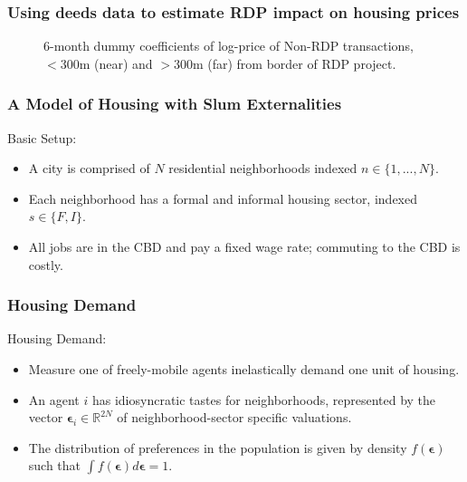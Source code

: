 \documentclass[aspectratio=149]{beamer}
\begin{document}

\begin{frame}
\frametitle{Using deeds data to estimate RDP impact on housing prices}

\begin{center}
\begin{figure}
\vspace{-3mm}
\caption{6-month dummy coefficients of log-price of Non-RDP transactions, $<$300m (near) and $>$300m (far) from border of RDP project.}
\end{figure}
\end{center}


\end{frame}




\begin{frame}
\frametitle{A Model of Housing with Slum Externalities}

Basic Setup:
\vspace{2mm}
\begin{itemize}
  \item A city is comprised of $N$ residential neighborhoods indexed $n\in\{1,...,N\}$. 
  \vspace{2mm}
  \item Each neighborhood has a formal and informal housing sector, indexed $s\in\{F,I\}$.
  \vspace{2mm}
  \item All jobs are in the CBD and pay a fixed wage rate; commuting to the CBD is costly.
\end{itemize}


\end{frame}


\begin{frame}
\frametitle{Housing Demand}

Housing Demand:
\vspace{2mm}
\begin{itemize}
  \item Measure one of freely-mobile agents inelastically demand one unit of housing.
  \vspace{2mm}
  \item An agent $i$ has idiosyncratic tastes for neighborhoods, represented by the vector $\bm{\epsilon}_i \in \mathbb{R}^{2N}$ of neighborhood-sector specific valuations.
  \vspace{2mm}
  \item The distribution of preferences in the population is given by density $f(\bm{\epsilon})$ such that $\int f(\bm{\epsilon}) d\bm{\epsilon} = 1$.
\end{itemize}


\end{frame}
\end{document}
